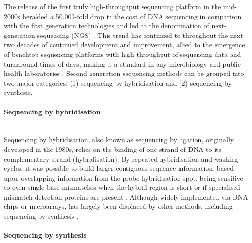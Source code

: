 The release of the first truly high-throughput sequencing platform in the mid-2000s heralded a 50,000-fold drop in the cost of DNA sequencing in comparison with the first generation technologies and led to the denomination of next-generation sequencing (NGS) \citep{goodwin_coming_2016}. This trend has continued to throughout the next two decades of continued development and improvement, allied to the emergence of benchtop sequencing platforms with high throughput of sequencing data and turnaround times of days, making it a standard in any microbiology and public health laboratories \citep{loman_twenty_2015}. Second generation sequencing methods can be grouped into two major categories: (1) sequencing by hybridisation and (2) sequencing by synthesis. 

\paragraph{Sequencing by hybridisation} \label{sssec:2nd_gen_seq_hybrid} \mbox{}\\

Sequencing by hybridisation, also known as sequencing by ligation, originally developed in the 1980s, relies on the binding of one strand of DNA to its complementary strand (hybridisation). By repeated hybridisation and washing cycles, it was possible to build larger contiguous sequence information, based upon overlapping information from the probe hybridisation spot, being sensitive to even single-base mismatches when the hybrid region is short or if specialised mismatch detection proteins are present \citep{slatko_overview_2018, detter_nucleic_2014}. Although widely implemented via DNA chips or microarrays, has largely been displaced by other methods, including sequencing by synthesis \citep{goodwin_coming_2016}. 

\paragraph{Sequencing by synthesis} \label{sssec:2nd_gen_seq_synth} \mbox{}\\

